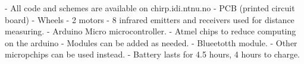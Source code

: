 - All code and schemes are available on chirp.idi.ntnu.no
- PCB (printed circuit board)
- Wheels
- 2 motors
- 8 infrared emitters and receivers used for distance measuring.
- Arduino Micro microcontroller.
- Atmel chips to reduce computing on the arduino
- Modules can be added as needed.
- Blueetotth module.
- Other micropchips can be used instead.
- Battery lasts for 4.5 hours, 4 hours to charge.



\textsl{}